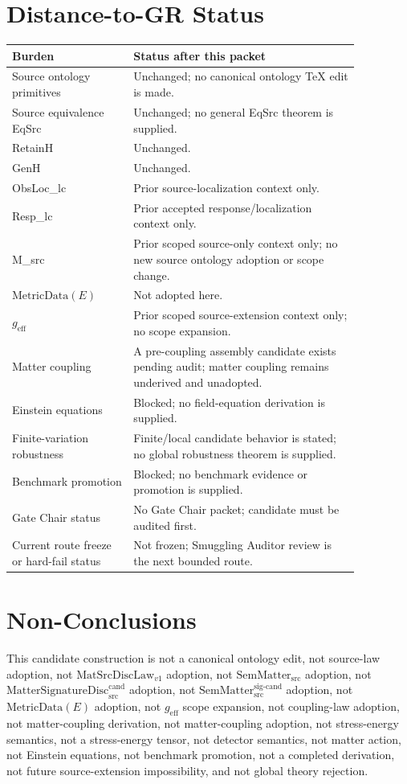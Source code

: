 \documentclass[11pt]{article}
\newcommand{\MetricData}{\mathrm{MetricData}}
\newcommand{\geff}{g_{\mathrm{eff}}}
\newcommand{\MatSrcDiscLaw}{\mathrm{MatSrcDiscLaw}_{v1}}
\newcommand{\SemMatterSrc}{\mathrm{SemMatter}_{\mathrm{src}}}
\newcommand{\SemMatterSig}{\mathrm{SemMatter}_{\mathrm{src}}^{\mathrm{sig\text{-}cand}}}
\newcommand{\MatSigDisc}{\mathrm{MatterSignatureDisc}_{\mathrm{src}}^{\mathrm{cand}}}
\begin{document}
\section{Distance-to-GR Status}

\begin{longtable}{p{0.30\linewidth}p{0.56\linewidth}}
\toprule
Burden & Status after this packet \\
\midrule
Source ontology primitives & Unchanged; no canonical ontology TeX edit is made. \\
Source equivalence EqSrc & Unchanged; no general EqSrc theorem is supplied. \\
RetainH & Unchanged. \\
GenH & Unchanged. \\
ObsLoc_lc & Prior source-localization context only. \\
Resp_lc & Prior accepted response/localization context only. \\
M_src & Prior scoped source-only context only; no new source ontology adoption or scope change. \\
\(\MetricData(E)\) & Not adopted here. \\
\(\geff\) & Prior scoped source-extension context only; no scope expansion. \\
Matter coupling & A pre-coupling assembly candidate exists pending audit; matter coupling remains underived and unadopted. \\
Einstein equations & Blocked; no field-equation derivation is supplied. \\
Finite-variation robustness & Finite/local candidate behavior is stated; no global robustness theorem is supplied. \\
Benchmark promotion & Blocked; no benchmark evidence or promotion is supplied. \\
Gate Chair status & No Gate Chair packet; candidate must be audited first. \\
Current route freeze or hard-fail status & Not frozen; Smuggling Auditor review is the next bounded route. \\
\bottomrule
\end{longtable}

\section{Non-Conclusions}

This candidate construction is not a canonical ontology edit, not source-law
adoption, not \(\MatSrcDiscLaw\) adoption, not \(\SemMatterSrc\) adoption, not
\(\MatSigDisc\) adoption, not \(\SemMatterSig\) adoption, not
\(\MetricData(E)\) adoption, not \(\geff\) scope expansion, not coupling-law
adoption, not matter-coupling derivation, not matter-coupling adoption, not
stress-energy semantics, not a stress-energy tensor, not detector semantics,
not matter action, not Einstein equations, not benchmark promotion, not a
completed derivation, not future source-extension impossibility, and not
global theory rejection.
\end{document}

